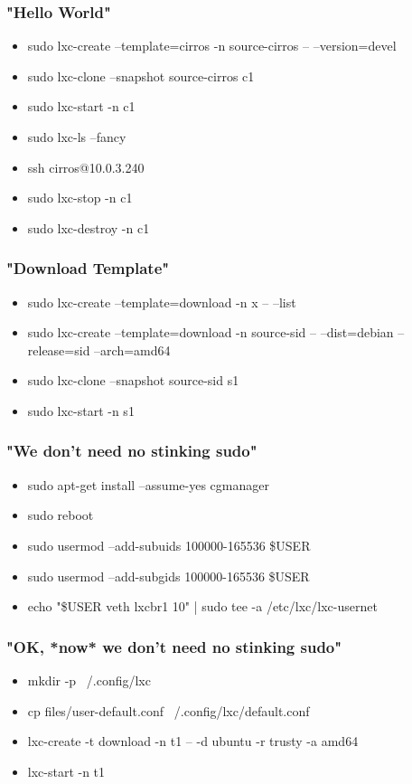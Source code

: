 \documentclass{beamer}
\begin{document}
\begin{frame}
   \frametitle{"Hello World"}
   \begin{itemize}
      \item sudo lxc-create --template=cirros -n source-cirros  -- --version=devel
      \item sudo lxc-clone --snapshot source-cirros c1
      \item sudo lxc-start -n c1
      \item sudo lxc-ls --fancy
      \item ssh cirros@10.0.3.240
      \item sudo lxc-stop -n c1
      \item sudo lxc-destroy -n c1
   \end{itemize}
\end{frame}

\begin{frame}
   \frametitle{"Download Template"}
   \begin{itemize}
      \item sudo lxc-create --template=download -n x -- --list
      \item sudo lxc-create --template=download -n source-sid -- --dist=debian --release=sid --arch=amd64
      \item sudo lxc-clone --snapshot source-sid s1
      \item sudo lxc-start -n s1
   \end{itemize}
\end{frame}

\begin{frame}
   \frametitle{"We don't need no stinking sudo"}
   \begin{itemize}
      \item sudo apt-get install --assume-yes cgmanager
      \item sudo reboot
      \item sudo usermod --add-subuids 100000-165536 \$USER
      \item sudo usermod --add-subgids 100000-165536 \$USER
      \item echo "\$USER veth lxcbr1 10" | sudo tee -a /etc/lxc/lxc-usernet
   \end{itemize}
\end{frame}

\begin{frame}
   \frametitle{"OK, *now* we don't need no stinking sudo"}
   \begin{itemize}
      \item mkdir -p ~/.config/lxc
      \item cp files/user-default.conf ~/.config/lxc/default.conf
      \item lxc-create -t download -n t1 -- -d ubuntu -r trusty -a amd64
      \item lxc-start -n t1
   \end{itemize}
\end{frame}
\end{document}
